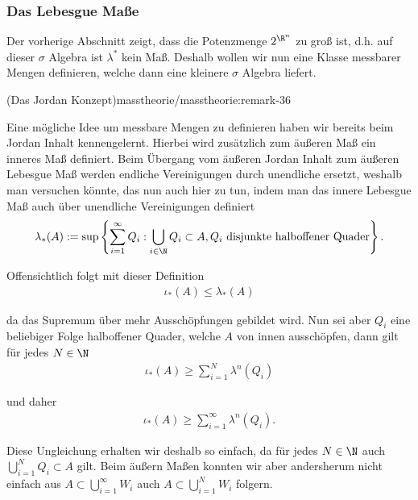 \documentclass[letterpaper,10pt,german]{jupyterBook}
\begin{document}
\subsubsection{Das Lebesgue Maße}
\label{\detokenize{masstheorie/masstheorie:das-lebesgue-masze}}
\par
Der vorherige Abschnitt zeigt, dass die Potenzmenge \(2^{\R^n}\) zu groß ist, d.h. auf dieser \(\sigma\) Algebra ist \(\lambda^\ast\) kein Maß. Deshalb wollen wir nun eine Klasse messbarer Mengen definieren, welche dann eine kleinere \(\sigma\) Algebra liefert.
\begin{remark}{(Das Jordan Konzept)}{masstheorie/masstheorie:remark-36}



\par
Eine mögliche Idee um messbare Mengen zu definieren haben wir bereits beim Jordan Inhalt kennengelernt. Hierbei wird zusätzlich zum äußeren Maß ein inneres Maß definiert. Beim Übergang vom äußeren Jordan Inhalt zum äußeren Lebesgue Maß werden endliche Vereinigungen durch unendliche ersetzt, weshalb man versuchen könnte, das nun auch hier zu tun, indem man das innere Lebesgue Maß auch über unendliche Vereinigungen definiert
\begin{align*}
\lambda_\ast(A) := \sup\left\{\sum_{i=1}^\infty Q_i: \bigcup_{i\in\N} Q_i \subset A, Q_i\text{ disjunkte halboffener Quader}\right\}.
\end{align*}
\par
Offensichtlich folgt mit dieser Definition
\begin{align*}
\iota_\ast(A)\leq \lambda_\ast(A)
\end{align*}
\par
da das Supremum über mehr Ausschöpfungen gebildet wird. Nun sei aber \(Q_i\) eine beliebiger Folge halboffener Quader, welche \(A\) von innen ausschöpfen, dann gilt für jedes \(N\in\N\)
\begin{align*}
\iota_\ast(A) \geq \sum_{i=1}^N \lambda^n(Q_i)
\end{align*}
\par
und daher
\begin{align*}
\iota_\ast(A)\geq \sum_{i=1}^\infty \lambda^n(Q_i).
\end{align*}
\par
Diese Ungleichung erhalten wir deshalb so einfach, da für jedes \(N\in\N\) auch \(\bigcup_{i=1}^N Q_i\subset A\) gilt. Beim äußern Maßen konnten wir aber andersherum nicht einfach aus \(A\subset \bigcup_{i=1}^\infty W_i\) auch \(A\subset \bigcup_{i=1}^N W_i\) folgern.


\end{remark}
\end{document}

